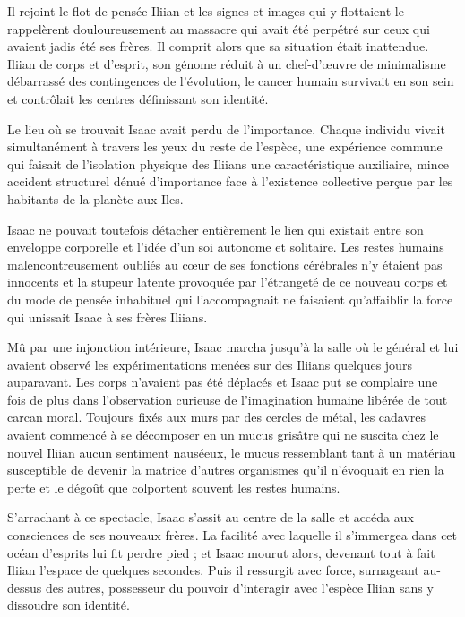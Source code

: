 \documentclass[12pt]{book}
\begin{document}
Il rejoint le flot de pensée Iliian et les signes et images qui y flottaient le rappelèrent douloureusement au massacre qui avait été perpétré sur ceux qui avaient jadis été ses frères. Il comprit alors que sa situation était inattendue. Iliian de corps et d'esprit, son génome réduit à un chef-d’œuvre de minimalisme débarrassé des contingences de l'évolution, le cancer humain survivait en son sein et contrôlait les centres définissant son identité.


Le lieu où se trouvait Isaac avait perdu de l'importance. Chaque individu vivait simultanément à travers les yeux du reste de l'espèce, une expérience commune qui faisait de l'isolation physique des Iliians une caractéristique auxiliaire, mince accident structurel dénué d'importance face à l'existence collective perçue par les habitants de la planète aux Iles.


Isaac ne pouvait toutefois détacher entièrement le lien qui existait entre son enveloppe corporelle et l'idée d'un soi autonome et solitaire. Les restes humains malencontreusement oubliés au cœur de ses fonctions cérébrales n'y étaient pas innocents et la stupeur latente provoquée par l'étrangeté de ce nouveau corps et du mode de pensée inhabituel qui l'accompagnait ne faisaient qu'affaiblir la force qui unissait Isaac à ses frères Iliians.


Mû par une injonction intérieure, Isaac marcha jusqu'à la salle où le général et lui avaient observé les expérimentations menées sur des Iliians quelques jours auparavant. Les corps n'avaient pas été déplacés et Isaac put se complaire une fois de plus dans l'observation curieuse de l'imagination humaine libérée de tout carcan moral. Toujours fixés aux murs par des cercles de métal, les cadavres avaient commencé à se décomposer en un mucus grisâtre qui ne suscita chez le nouvel Iliian aucun sentiment nauséeux, le mucus ressemblant tant à un matériau susceptible de devenir la matrice d'autres organismes qu'il n'évoquait en rien la perte et le dégoût que colportent souvent les restes humains.


S'arrachant à ce spectacle, Isaac s'assit au centre de la salle et accéda aux consciences de ses nouveaux frères. La facilité avec laquelle il s'immergea dans cet océan d'esprits lui fit perdre pied ; et Isaac mourut alors, devenant tout à fait Iliian l'espace de quelques secondes. Puis il ressurgit avec force, surnageant au-dessus des autres, possesseur du pouvoir d'interagir avec l'espèce Iliian sans y dissoudre son identité.
\end{document}
